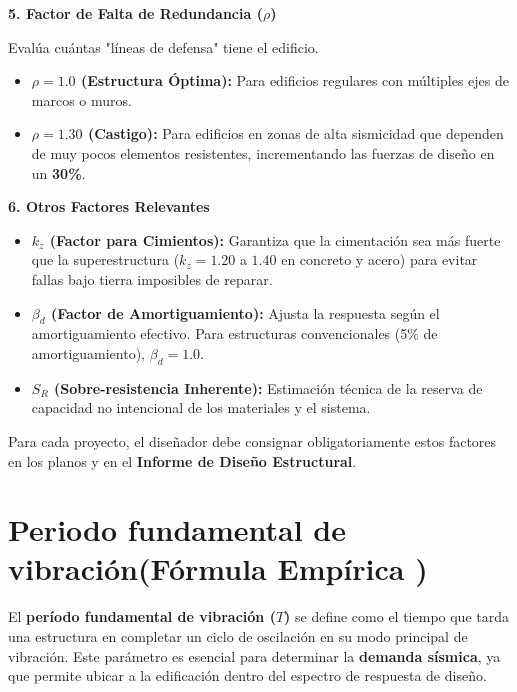 \documentclass[14pt,letterpaper]{extarticle}
\begin{document}
\textbf{5. Factor de Falta de Redundancia ($\rho$)}

Evalúa cuántas "líneas de defensa" tiene el edificio.

\begin{itemize}
	\item \textbf{$\rho = 1.0$ (Estructura Óptima):} Para edificios regulares con múltiples ejes de marcos o muros.
	\item \textbf{$\rho = 1.30$ (Castigo):} Para edificios en zonas de alta sismicidad que dependen de muy pocos elementos resistentes, incrementando las fuerzas de diseño en un \textbf{30\%}.
\end{itemize}

\textbf{6. Otros Factores Relevantes}

\begin{itemize}
	\item \textbf{$k_z$ (Factor para Cimientos):} Garantiza que la cimentación sea más fuerte que la superestructura ($k_z=1.20$ a $1.40$ en concreto y acero) para evitar fallas bajo tierra imposibles de reparar.
	\item \textbf{$\beta_d$ (Factor de Amortiguamiento):} Ajusta la respuesta según el amortiguamiento efectivo. Para estructuras convencionales (5\% de amortiguamiento), $\beta_d = 1.0$.
	\item \textbf{$S_R$ (Sobre-resistencia Inherente):} Estimación técnica de la reserva de capacidad no intencional de los materiales y el sistema.
\end{itemize}

Para cada proyecto, el diseñador debe consignar obligatoriamente estos factores en los planos y en el \textbf{Informe de Diseño Estructural}.


















\newpage
\section{Periodo fundamental de vibración(Fórmula Empírica )}

El \textbf{período fundamental de vibración ($T$)} se define como el tiempo que tarda una estructura en completar un ciclo de oscilación en su modo principal de vibración. Este parámetro es esencial para determinar la \textbf{demanda sísmica}, ya que permite ubicar a la edificación dentro del espectro de respuesta de diseño.
\end{document}
